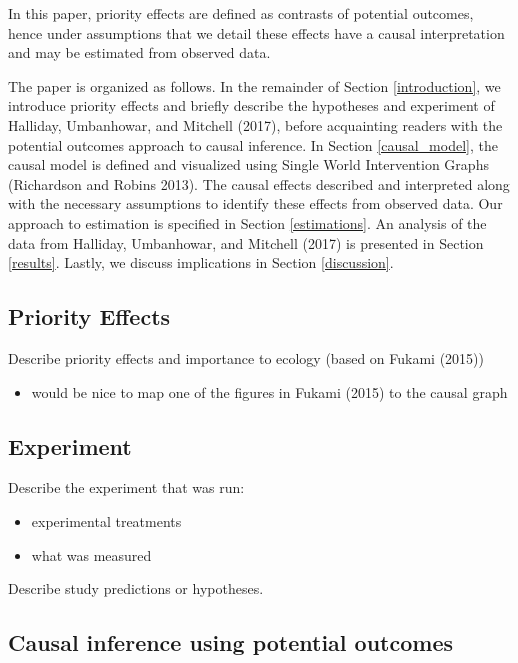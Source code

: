 \documentclass[]{article}
\providecommand{\tightlist}{%
  \setlength{\itemsep}{0pt}\setlength{\parskip}{0pt}}
\begin{document}
In this paper, priority effects are defined as contrasts of potential
outcomes, hence under assumptions that we detail these effects have a
causal interpretation and may be estimated from observed data.

The paper is organized as follows. In the remainder of Section
\ref{introduction}, we introduce priority effects and briefly describe
the hypotheses and experiment of Halliday, Umbanhowar, and Mitchell
(2017), before acquainting readers with the potential outcomes approach
to causal inference. In Section \ref{causal_model}, the causal model is
defined and visualized using Single World Intervention Graphs
(Richardson and Robins 2013). The causal effects described and
interpreted along with the necessary assumptions to identify these
effects from observed data. Our approach to estimation is specified in
Section \ref{estimations}. An analysis of the data from Halliday,
Umbanhowar, and Mitchell (2017) is presented in Section \ref{results}.
Lastly, we discuss implications in Section \ref{discussion}.

\hypertarget{priority-effects}{%
\subsection{Priority Effects}\label{priority-effects}}

Describe priority effects and importance to ecology (based on Fukami
(2015))

\begin{itemize}
\tightlist
\item
  would be nice to map one of the figures in Fukami (2015) to the causal
  graph
\end{itemize}

\hypertarget{experiment}{%
\subsection{Experiment}\label{experiment}}

Describe the experiment that was run:

\begin{itemize}
\tightlist
\item
  experimental treatments
\item
  what was measured
\end{itemize}

Describe study predictions or hypotheses.

\hypertarget{causal-inference-using-potential-outcomes}{%
\subsection{Causal inference using potential
outcomes}\label{causal-inference-using-potential-outcomes}}
\end{document}
